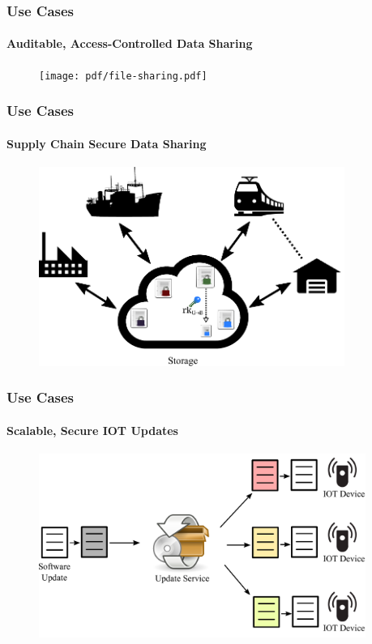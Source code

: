 \documentclass[xetex,mathsans,sans,aspectratio=169]{beamer}
\begin{document}
    \begin{frame}
        \frametitle{Use Cases}
        \framesubtitle{Auditable, Access-Controlled Data Sharing}
        \begin{figure}
            \centering
            \texttt{[image: pdf/file-sharing.pdf]}
        \end{figure}
    \end{frame}

    \begin{frame}
        \frametitle{Use Cases}
        \framesubtitle{Supply Chain Secure Data Sharing}
        \begin{figure}
            \centering
            \includegraphics[height=6.5cm]{pdf/supply-chain.pdf}
        \end{figure}
    \end{frame}

    \begin{frame}
        \frametitle{Use Cases}
        \framesubtitle{Scalable, Secure IOT Updates}
        \begin{figure}
            \centering
            \includegraphics[height=6cm]{pdf/iot-updates.pdf}
        \end{figure}
    \end{frame}
\end{document}
